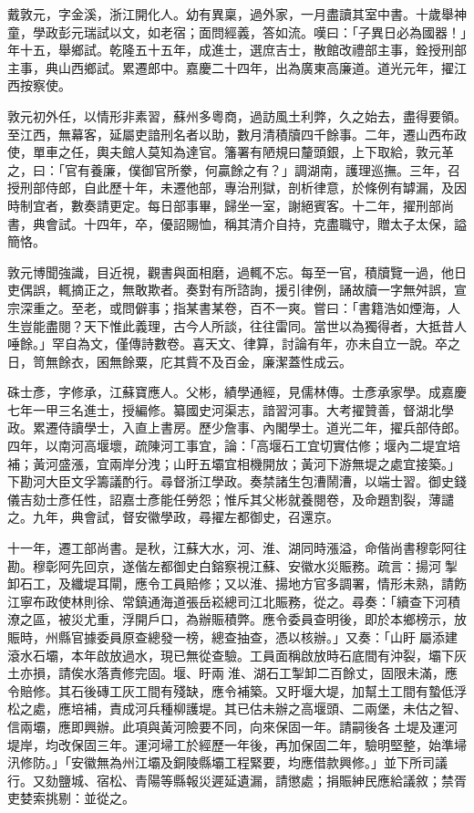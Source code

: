 \begin{pinyinscope}
戴敦元，字金溪，浙江開化人。幼有異稟，過外家，一月盡讀其室中書。十歲舉神童，學政彭元瑞試以文，如老宿；面問經義，答如流。嘆曰：「子異日必為國器！」年十五，舉鄉試。乾隆五十五年，成進士，選庶吉士，散館改禮部主事，銓授刑部主事，典山西鄉試。累遷郎中。嘉慶二十四年，出為廣東高廉道。道光元年，擢江西按察使。

敦元初外任，以情形非素習，蘇州多粵商，過訪風土利弊，久之始去，盡得要領。至江西，無幕客，延屬吏諳刑名者以助，數月清積牘四千餘事。二年，遷山西布政使，單車之任，輿夫館人莫知為達官。籓署有陋規曰釐頭銀，上下取給，敦元革之，曰：「官有養廉，僕御官所豢，何贏餘之有？」調湖南，護理巡撫。三年，召授刑部侍郎，自此歷十年，未遷他部，專治刑獄，剖析律意，於條例有罅漏，及因時制宜者，數奏請更定。每日部事畢，歸坐一室，謝絕賓客。十二年，擢刑部尚書，典會試。十四年，卒，優詔賜恤，稱其清介自持，克盡職守，贈太子太保，謚簡恪。

敦元博聞強識，目近視，觀書與面相磨，過輒不忘。每至一官，積牘覽一過，他日吏偶誤，輒摘正之，無敢欺者。奏對有所諮詢，援引律例，誦故牘一字無舛誤，宣宗深重之。至老，或問僻事；指某書某卷，百不一爽。嘗曰：「書籍浩如煙海，人生豈能盡閱？天下惟此義理，古今人所談，往往雷同。當世以為獨得者，大抵昔人唾餘。」罕自為文，僅傳詩數卷。喜天文、律算，討論有年，亦未自立一說。卒之日，笥無餘衣，囷無餘粟，庀其貲不及百金，廉潔蓋性成云。

硃士彥，字修承，江蘇寶應人。父彬，績學通經，見儒林傳。士彥承家學。成嘉慶七年一甲三名進士，授編修。纂國史河渠志，諳習河事。大考擢贊善，督湖北學政。累遷侍讀學士，入直上書房。歷少詹事、內閣學士。道光二年，擢兵部侍郎。四年，以南河高堰壞，疏陳河工事宜，論：「高堰石工宜切實估修；堰內二堤宜培補；黃河盛漲，宜兩岸分洩；山盱五壩宜相機開放；黃河下游無堤之處宜接築。」下勘河大臣文孚籌議酌行。尋督浙江學政。奏禁諸生包漕鬧漕，以端士習。御史錢儀吉劾士彥任性，詔嘉士彥能任勞怨；惟斥其父彬就養閱卷，及命題割裂，薄譴之。九年，典會試，督安徽學政，尋擢左都御史，召還京。

十一年，遷工部尚書。是秋，江蘇大水，河、淮、湖同時漲溢，命偕尚書穆彰阿往勘。穆彰阿先回京，遂偕左都御史白鎔察視江蘇、安徽水災賑務。疏言：揚河掣卸石工，及纖堤耳閘，應令工員賠修；又以淮、揚地方官多調署，情形未熟，請飭江寧布政使林則徐、常鎮通海道張岳崧總司江北賑務，從之。尋奏：「續查下河積潦之區，被災尤重，浮開戶口，為辦賑積弊。應令委員查明後，即於本鄉榜示，放賑時，州縣官據委員原查總發一榜，總查抽查，憑以核辦。」又奏：「山盱屬添建滾水石壩，本年啟放過水，現已無從查驗。工員面稱啟放時石底間有沖裂，壩下灰土亦損，請俟水落責修完固。堰、盱兩淮、湖石工掣卸二百餘丈，固限未滿，應令賠修。其石後磚工灰工間有殘缺，應令補築。又盱堰大堤，加幫土工間有蟄低浮松之處，應培補，責成河兵種柳護堤。其已估未辦之高堰頭、二兩堡，未估之智、信兩壩，應即興辦。此項與黃河險要不同，向來保固一年。請嗣後各土堤及運河堤岸，均改保固三年。運河埽工於經歷一年後，再加保固二年，驗明堅整，始準埽汛修防。」「安徽無為州江壩及銅陵縣壩工程緊要，均應借款興修。」並下所司議行。又劾鹽城、宿松、青陽等縣報災遲延遺漏，請懲處；捐賑紳民應給議敘；禁胥吏婪索挑剔：並從之。


\end{pinyinscope}
